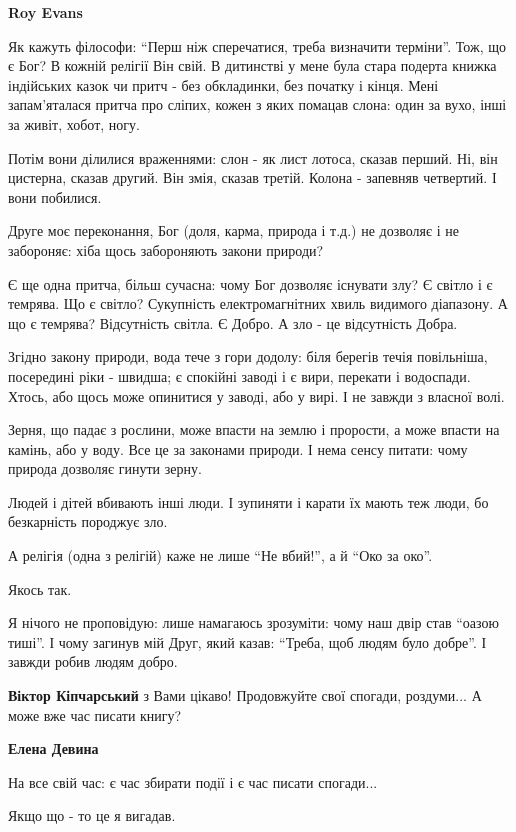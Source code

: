 \begin{itemize}
\textbf{Roy Evans} 

Як кажуть філософи: \enquote{Перш ніж сперечатися, треба визначити терміни}. Тож, що є
Бог? В кожній релігії Він свій. В дитинстві у мене була стара подерта книжка
індійських казок чи притч - без обкладинки, без початку і кінця. Мені
запам'яталася притча про сліпих, кожен з яких помацав слона: один за вухо, інші
за живіт, хобот, ногу.

Потім вони ділилися враженнями: слон - як лист лотоса, сказав перший. Ні, він
цистерна, сказав другий. Він змія, сказав третій. Колона - запевняв четвертий.
І вони побилися.

Друге моє переконання, Бог (доля, карма, природа і т.д.) не дозволяє і не
забороняє: хіба щось забороняють закони природи?

Є ще одна притча, більш сучасна: чому Бог дозволяє існувати злу? Є світло і є
темрява. Що є світло? Сукупність електромагнітних хвиль видимого діапазону. А
що є темрява? Відсутність світла. Є Добро. А зло - це відсутність Добра.

Згідно закону природи, вода тече з гори додолу: біля берегів течія повільніша,
посередині ріки - швидша; є спокійні заводі і є вири, перекати і водоспади.
Хтось, або щось може опинитися у заводі, або у вирі. І не завжди з власної
волі.

Зерня, що падає з рослини, може впасти на землю і прорости, а може впасти на
камінь, або у воду. Все це за законами природи. І нема сенсу питати: чому
природа дозволяє гинути зерну.

Людей і дітей вбивають інші люди. І зупиняти і карати їх мають теж люди, бо
безкарність породжує зло.

А релігія (одна з релігій) каже не лише \enquote{Не вбий!}, а й \enquote{Око за око}.

Якось так.

Я нічого не проповідую: лише намагаюсь зрозуміти: чому наш двір став
\enquote{оазою тиші}. І чому загинув мій Друг, який казав: \enquote{Треба, щоб
людям було добре}. І завжди робив людям добро.

\textbf{Віктор Кіпчарський} з Вами цікаво! Продовжуйте свої спогади, роздуми... А може вже час писати книгу?

\textbf{Елена Девина} 

На все свій час: є час збирати події і є час писати спогади...

Якщо що - то це я вигадав.


\end{itemize}
